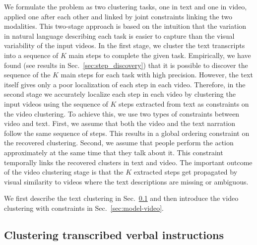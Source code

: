 \documentclass[10pt,twocolumn,letterpaper]{article}
\begin{document}
%
 We formulate the problem as two clustering tasks, one in text and one in video, applied one after each other and linked by joint constraints linking the two modalities.
  This two-stage approach is based on the intuition that the variation in natural language describing each task is easier to capture than the visual variability of the input videos. 
 In the first stage, we cluster the text transcripts into a sequence of $K$ main steps to complete the given task.  Empirically, we have found (see results in Sec.~\ref{sec:step_discovery}) that it is possible to discover the sequence of the $K$ main steps for each task with high precision. However, the text itself gives only a poor localization of each step in each video. 
 Therefore, in the second stage we accurately localize each step in each video by clustering the input videos using the sequence of $K$ steps extracted from text as constraints on the video clustering. 
%
%
%
%
%
To achieve this, we use two types of constraints between video and text.  First, we assume that both the video and the text narration follow the same sequence of steps. This results in a global ordering constraint on the recovered clustering. Second, we assume that people perform the action approximately at the same time that they talk about it. This constraint temporally links the recovered clusters in text and video. %
%
%
The important outcome of the video clustering stage is that the $K$ extracted steps get propagated by visual similarity to videos where the text descriptions are missing or ambiguous. 

We first describe the text clustering in Sec.~\ref{subsec:model_text} and then introduce the video clustering with constraints in Sec.~\ref{sec:model-video}.
%
%
%
%

%
%
%


%
%
%



%

%
%
%
%
%
%
%
%
%
%
%
%
%
%
%
%
%
%
%
%
%
%
%
%
%
%
%
%
%
%
%
%
%
%
%
%
%
%
%
%

\subsection{Clustering transcribed verbal instructions}
\label{subsec:model_text}
\label{sec:text}
\end{document}
